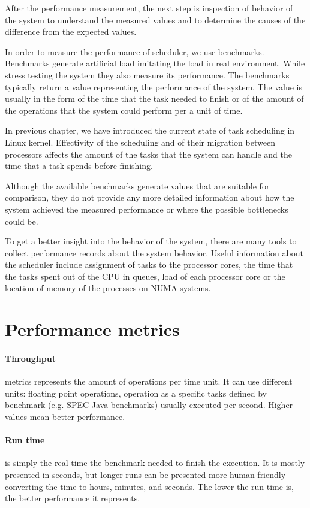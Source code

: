 After the performance measurement, the next step is inspection of behavior of
the system to understand the measured values and to determine the causes of the
difference from the expected values.

In order to measure the performance of scheduler, we use benchmarks.
Benchmarks generate artificial load imitating the load in real environment.
While stress testing the system they also measure its performance. The benchmarks
typically return a value representing the performance of the system. The value
is usually in the form of the time that the task needed to finish or of the amount of
the operations that the system could perform per a unit of time.

In previous chapter, we have introduced the current state of task scheduling in
Linux kernel.
Effectivity of the scheduling and of their migration between processors affects
the amount of the tasks that the system can handle and the time that a task
spends before finishing.

Although the available benchmarks generate values that are suitable for comparison, they
do not provide any more detailed information about how the system achieved the
measured performance or where the possible bottlenecks could be.

To get a better insight into the behavior of the system, there are many tools to
collect performance records about the system behavior. Useful information about the
scheduler include assignment of tasks to the processor cores, the time that the
tasks spent out of the CPU in queues, load of each processor core or the
location of memory of the processes on NUMA systems.

\section{Performance metrics} \label{sec:metrics}
\paragraph{Throughput} metrics represents the amount of operations per time
unit. It can use different units: floating point operations, operation as
a specific tasks defined by benchmark (e.g. SPEC Java benchmarks) usually
executed per second. Higher values mean better performance.

\paragraph{Run time} is simply the real time the benchmark needed to finish the
execution. It is mostly presented in seconds, but longer runs can be presented
more human-friendly converting the time to hours, minutes, and seconds. The
lower the run time is, the better performance it represents.

